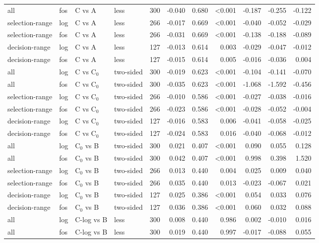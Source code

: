 \begin{longtable}{llllrrrrrrr}
all & fos & C vs A & less & 300 & -0.040 & 0.680 & <0.001 & -0.187 & -0.255 & -0.122 \\
selection-range & log & C vs A & less & 266 & -0.017 & 0.669 & <0.001 & -0.040 & -0.052 & -0.029 \\
selection-range & fos & C vs A & less & 266 & -0.031 & 0.669 & <0.001 & -0.138 & -0.188 & -0.089 \\
decision-range & log & C vs A & less & 127 & -0.013 & 0.614 & 0.003 & -0.029 & -0.047 & -0.012 \\
decision-range & fos & C vs A & less & 127 & -0.015 & 0.614 & 0.005 & -0.016 & -0.036 & 0.004 \\
all & log & C vs C$_0$ & two-sided & 300 & -0.019 & 0.623 & <0.001 & -0.104 & -0.141 & -0.070 \\
all & fos & C vs C$_0$ & two-sided & 300 & -0.035 & 0.623 & <0.001 & -1.068 & -1.592 & -0.456 \\
selection-range & log & C vs C$_0$ & two-sided & 266 & -0.010 & 0.586 & <0.001 & -0.027 & -0.038 & -0.016 \\
selection-range & fos & C vs C$_0$ & two-sided & 266 & -0.023 & 0.586 & <0.001 & -0.028 & -0.052 & -0.004 \\
decision-range & log & C vs C$_0$ & two-sided & 127 & -0.016 & 0.583 & 0.006 & -0.041 & -0.058 & -0.025 \\
decision-range & fos & C vs C$_0$ & two-sided & 127 & -0.024 & 0.583 & 0.016 & -0.040 & -0.068 & -0.012 \\
all & log & C$_0$ vs B & two-sided & 300 & 0.021 & 0.407 & <0.001 & 0.090 & 0.055 & 0.128 \\
all & fos & C$_0$ vs B & two-sided & 300 & 0.042 & 0.407 & <0.001 & 0.998 & 0.398 & 1.520 \\
selection-range & log & C$_0$ vs B & two-sided & 266 & 0.013 & 0.440 & 0.004 & 0.025 & 0.009 & 0.040 \\
selection-range & fos & C$_0$ vs B & two-sided & 266 & 0.035 & 0.440 & 0.013 & -0.023 & -0.067 & 0.021 \\
decision-range & log & C$_0$ vs B & two-sided & 127 & 0.025 & 0.386 & <0.001 & 0.054 & 0.033 & 0.076 \\
decision-range & fos & C$_0$ vs B & two-sided & 127 & 0.036 & 0.386 & <0.001 & 0.060 & 0.032 & 0.088 \\
all & log & C-log vs B & less & 300 & 0.008 & 0.440 & 0.986 & 0.002 & -0.010 & 0.016 \\
all & fos & C-log vs B & less & 300 & 0.019 & 0.440 & 0.997 & -0.017 & -0.088 & 0.055 \\

\end{longtable}

